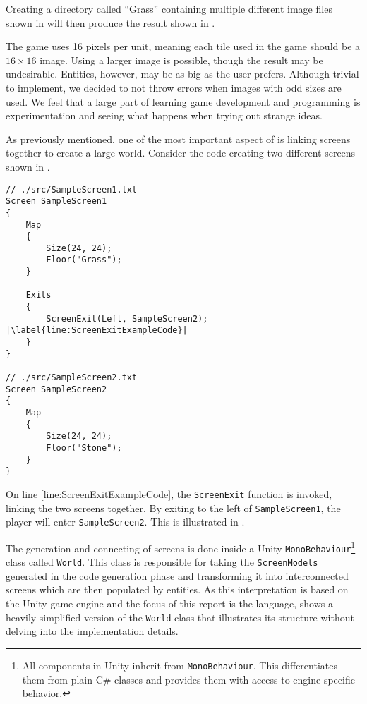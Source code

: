 Creating a directory called ``Grass'' containing multiple different image files shown in  will then produce the result shown in .



The game uses 16 pixels per unit, meaning each tile used in the game should be a $16\times 16$ image. Using a larger image is possible, though the result may be undesirable. Entities, however, may be as big as the user prefers. 
Although trivial to implement, we decided to not throw errors when images with odd sizes are used. We feel that a large part of learning game development and programming is experimentation and seeing what happens when trying out strange ideas.


As previously mentioned, one of the most important aspect of \dazel{} is linking screens together to create a large world. Consider the code creating two different screens shown in .

\begin{lstlisting}[language=CSharp, caption={}, label={lst:DazelScreenExit},escapechar=|]
// ./src/SampleScreen1.txt
Screen SampleScreen1 
{
	Map 
	{
		Size(24, 24);
		Floor("Grass");
	}

	Exits
	{
		ScreenExit(Left, SampleScreen2); |\label{line:ScreenExitExampleCode}|
	}
}

// ./src/SampleScreen2.txt
Screen SampleScreen2
{
	Map 
	{
		Size(24, 24);
		Floor("Stone");
	}
}
\end{lstlisting}

On line \ref{line:ScreenExitExampleCode}, the \texttt{ScreenExit} function is invoked, linking the two screens together.
By exiting to the left of \texttt{SampleScreen1}, the player will enter \texttt{SampleScreen2}.
This is illustrated in .


The generation and connecting of screens is done inside a Unity \texttt{MonoBehaviour}\footnote{All components in Unity inherit from \texttt{MonoBehaviour}. This differentiates them from plain C\# classes and provides them with access to engine-specific behavior.} class called \texttt{World}.
This class is responsible for taking the \texttt{ScreenModels} generated in the code generation phase and transforming it into interconnected screens which are then populated by entities. 
As this interpretation is based on the Unity game engine and the focus of this report is the \dazel{} language, 
 shows a heavily simplified version of the \texttt{World} class that illustrates its structure without delving into the implementation details.

